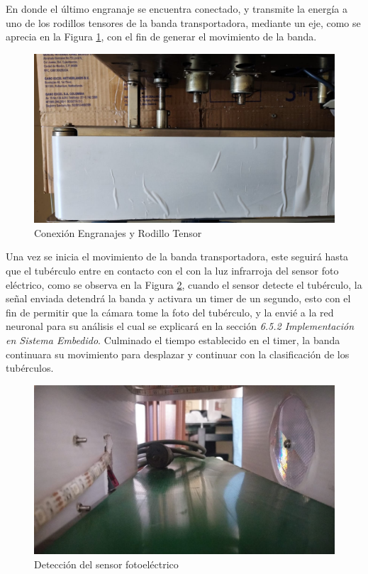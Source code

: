 En donde el último engranaje se encuentra conectado, y transmite la energía a uno de los rodillos tensores de la banda transportadora, mediante un eje, como se aprecia en la Figura \ref{fig:eje}, con el fin de generar el movimiento de la banda. 

\newpage
\begin{figure}[ht]
	\centering
	\includegraphics[angle=270, scale=0.21]{Figs/202.jpg}
	\caption{Conexión Engranajes y Rodillo Tensor}
	\label{fig:eje}
\end{figure}


Una vez se inicia el movimiento de la banda transportadora, este seguirá hasta que el tubérculo entre en contacto con el con la luz infrarroja del sensor foto eléctrico, como se observa en la Figura \ref{fig:sensor}, cuando el sensor detecte el tubérculo, la señal enviada detendrá la banda y activara un timer de un segundo, esto con el fin de permitir que la cámara tome la foto del tubérculo, y la envié a la red neuronal para su análisis el cual se explicará en la sección \textit{6.5.2 Implementación en Sistema Embedido}. Culminado el tiempo establecido en el timer, la banda continuara su movimiento para desplazar y continuar con la clasificación de los tubérculos.

\begin{figure}[ht]
	\centering
	\includegraphics[scale=0.15]{Figs/203.jpg}
	\caption{Detección del sensor fotoeléctrico}
	\label{fig:sensor}
\end{figure}


